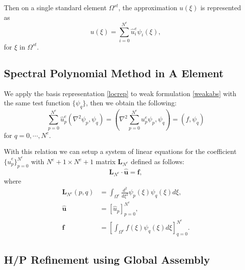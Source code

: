 Then on a single standard element $\Omega^{st}$, the approximation
$u(\xi)$ is represented as
\begin{equation}\label{locrep}
u(\xi) = \sum_{i=0}^{N^e} \hat u_{i}^{e}\psi_i(\xi),
\end{equation}
for $\xi$ in $\Omega^{st}$.

\subsection {Spectral Polynomial Method in A Element}


We apply the basis representation \ref{locrep} to weak formulation
\ref{weakabs} with the same test function $\{\psi_q\}$, then we
obtain the following:
\begin{equation}\label{locmat}
 \sum_{p=0}^{N^e} \hat u_p^e \left(\nabla^2 \psi_p, \psi_q \right)
= \left(\nabla^2 \sum_{p=0}^{N^e} u_p^e \psi_p, \psi_q\right) =
\left( f, \psi_q \right)
\end{equation}
for $q = 0, \cdots, N^e$.

With this relation we can setup a system of linear equations for
the coefficient $\{\hat u_p^e\}_{p=0}^{N^e}$ with $N^e+1 \times
N^e+1$ matrix $\mathbf{L}_{N^e}$ defined as follows:
\begin{equation}\label{loceqn}
    \mathbf{L}_{N^e} \cdot \mathbf{\hat u} = \mathbf{f},
\end{equation}
where
\begin{eqnarray}\label{locdefs}
\mathbf{L}_{N^e}(p,q) &=
\int_{\Omega^e}\frac{d^2}{d\xi^2}\psi_p(\xi)\psi_q(\xi) d\xi, \\
\mathbf{\hat u} &= \left[\hat u_p\right]_{p=0}^{N^e}, \\
\mathbf{f} &= \left[ \int_{\Omega^e} f(\xi) \psi_q(\xi) d\xi
\right]_{q=0}^{N^e}.
\end{eqnarray}

\subsection {H/P Refinement using Global Assembly}

